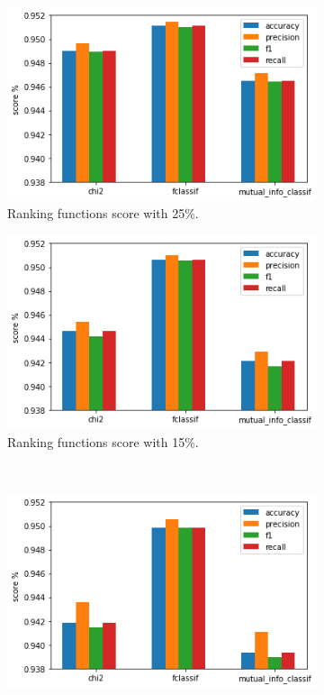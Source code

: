 \begin{figure}[]
	\centering
	\begin{subfigure}[t]{0.8\textwidth}
		\centering
		\includegraphics[width=\linewidth]{rank25.png}
		\caption{Ranking functions score with 25\%.}\label{fig:ranking25}		
	\end{subfigure}
	\begin{subfigure}[t]{.8\textwidth}
		\centering
		\includegraphics[width=\linewidth]{rank15.png}
		\caption{Ranking functions score with 15\%.}\label{fig:ranking15}
	\end{subfigure}\\
	\begin{subfigure}[t]{.8\textwidth}
		\centering
		\includegraphics[width=\linewidth]{rank10.png}

\end{subfigure}
\end{figure}
